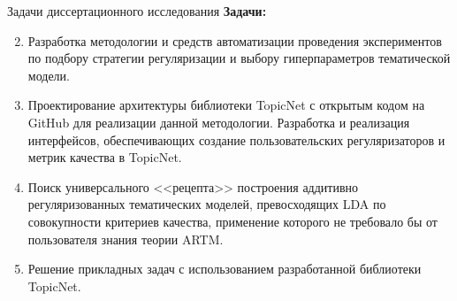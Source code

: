 \begin{frame}[t]{Задачи диссертационного исследования}
\textbf{Задачи:}
\begin{enumerate} \setcounter{enumi}{1}
      \smallskip\item Разработка методологии и средств автоматизации проведения экспериментов по подбору стратегии регуляризации и выбору гиперпараметров тематической модели.
    \smallskip  \item Проектирование архитектуры библиотеки TopicNet с открытым кодом на GitHub для реализации данной методологии. Разработка и реализация интерфейсов, обеспечивающих создание пользовательских регуляризаторов и метрик качества в TopicNet.
    \smallskip  \item Поиск универсального <<рецепта>> построения аддитивно регуляризованных тематических моделей, превосходящих LDA по совокупности критериев качества, применение которого не требовало бы от пользователя знания теории ARTM.
    \smallskip\item Решение прикладных задач с использованием разработанной библиотеки TopicNet.

\end{enumerate}
\end{frame}






